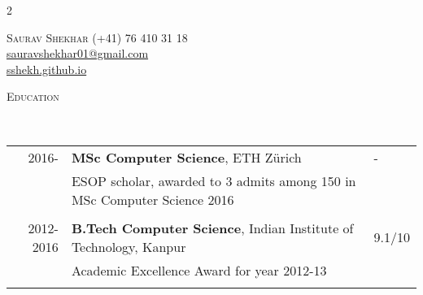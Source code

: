\documentclass[9pt]{article}
\renewcommand{\arraystretch}{1.5}
\newenvironment{changemargin}[2]{%
  \begin{list}{}{%
      \setlength{\topsep}{0pt}%
    \setlength{\leftmargin}{#1}%
    \setlength{\rightmargin}{#2}%
    \setlength{\listparindent}{\parindent}%
  \setlength{\itemindent}{\parindent}%
    \setlength{\parsep}{\parskip}%
    }%
  \item[]}{\end{list}
    }
\newcommand{\lineover}{
  \begin{changemargin}{-0.05in}{-0.10in}
    \vspace*{-9pt}
    \hrulefill \\
    \vspace*{-2pt}
  \end{changemargin}
}
\newcommand{\header}[1]{
  \begin{changemargin}{-0.5in}{-0.5in}
    \scshape{#1}\\
        \lineover
  \end{changemargin}
}
\newcommand{\name}[1]{
  {\LARGE \scshape {#1}}
}
\newcommand{\contact}[4]{
  \begin{changemargin}{-0.65in}{-0.65in}
    \begin{multicols}{2}
      \name{{#1}}\vfill\null %
                        \columnbreak
                        {#2}\\	
                        {#3}\\ 
                        {#4}\\ 
    \end{multicols}
  \end{changemargin}
}
\begin{document}
\contact{Saurav Shekhar}
{{\hspace{172pt}}(+41) 76 410 31 18}
{{\hspace{130pt}} \href{mailto:sauravshekhar01@gmail.com}{sauravshekhar01@gmail.com}}
{{\hspace{180pt}} \href{https://sshekh.github.io/}{sshekh.github.io}}  

\header{Education}

\vspace{4pt}
        \renewcommand{\arraystretch}{1}
        \begin{tabular}{rll}
          2016- & \textbf{MSc Computer Science},  ETH Z{\"u}rich  &- \\
                  & ESOP scholar, awarded to 3 admits among 150 in MSc Computer Science 2016 &\\\\
          2012-2016 & \textbf{B.Tech Computer Science},  Indian Institute of Technology, Kanpur & 9.1/10 \\ 
                  &  Academic Excellence Award for year 2012-13 & \\\\
        \end{tabular}
\end{document}
